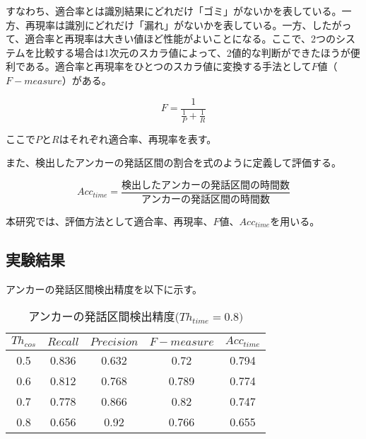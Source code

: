 すなわち、適合率とは識別結果にどれだけ「ゴミ」がないかを表している。一方、再現率は識別にどれだけ「漏れ」がないかを表している。一方、したがって、適合率と再現率は大きい値ほど性能がよいことになる。ここで、2つのシステムを比較する場合は1次元のスカラ値によって、2値的な判断ができたほうが便利である。適合率と再現率をひとつのスカラ値に変換する手法として$F$値（$F-measure$）がある。

\begin{equation}
\label{calc:fmeasure}
F = \frac{1}{\frac{1}{P} + \frac{1}{R}}
\end{equation}

ここで$P$と$R$はそれぞれ適合率、再現率を表す。

また、検出したアンカーの発話区間の割合を式のように定義して評価する。

\begin{equation}
\label{calc:anchor_acc}
Acc_{time} = \frac{検出したアンカーの発話区間の時間数}{アンカーの発話区間の時間数}
\end{equation}

本研究では、評価方法として適合率、再現率、$F$値、$Acc_{time}$を用いる。

\subsection{実験結果}
アンカーの発話区間検出精度を以下に示す。

\begin{table}[H]
  \begin{center}
    \caption{アンカーの発話区間検出精度($Th_{time}=0.8)$ \label{table:result_get_anchor08}}
    \begin{tabular}{|c||c|c|c|c|} \hline
      $Th_{cos}$ & $Recall$ & $Precision$ & $F-measure$ & $Acc_{time}$\\ \hline
0.5 & 0.836 & 0.632 & 0.72 & 0.794 \\ \hline
0.6 & 0.812 & 0.768 & 0.789 & 0.774 \\ \hline
0.7 & 0.778 & 0.866 & 0.82 & 0.747 \\ \hline
0.8 & 0.656 & 0.92 & 0.766 & 0.655 \\ \hline

    \end{tabular}
  \end{center}
\end{table}

